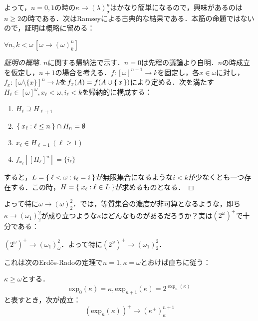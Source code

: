 \documentclass[a4paper]{bxjsarticle}
\newcommand{\Erdos}{Erd\H{o}s}
\begin{document}
よって，$n = 0, 1$の時の$\kappa \longrightarrow (\lambda)^n_\sigma$はかなり簡単になるので，興味があるのは$n \geq 2$の時である．次はRamseyによる古典的な結果である．本筋の命題ではないので，証明は概略に留める：
\begin{theorem}[Ramsey]
 $\forall n, k < \omega\, [\omega \longrightarrow (\omega)^n_k]$
\end{theorem}
\begin{proof}[証明の概略]
 $n$に関する帰納法で示す．$n = 0$は先程の議論より自明．$n$の時成立を仮定し，$n+1$の場合を考える．$f: [\omega]^{n+1} \rightarrow k$を固定し，各$x \in \omega$に対し，$f_x : [\omega \setminus \{x\}]^n \rightarrow k$を$f_x(A) = f(A \cup \set{x})$により定める．次を満たす$H_\ell \in [\omega]^\omega, x_\ell < \omega, i_\ell < k$を帰納的に構成する：
 \begin{enumerate}[label=(\alph*)]
  \item $H_\ell \supseteq H_{\ell+1}$
  \item $\Set{x_\ell : \ell \leq n} \cap H_{n} = \emptyset$
  \item $x_\ell \in H_{\ell - 1}\, (\ell \geq 1)$
  \item $f_{x_\ell}\left[[H_\ell]^n\right] = \{i_\ell\}$
 \end{enumerate}
 すると，$L = \Set{\ell < \omega : i_\ell = i}$が無限集合になるような$i < k$が少なくとも一つ存在する．この時，$H = \Set{x_\ell : \ell \in L}$が求めるものとなる．\mbox{}
\end{proof}

よって特に$\omega \longrightarrow (\omega)^2_2$．では，等質集合の濃度が非可算となるような，即ち$\kappa \longrightarrow (\omega_1)^2_2$が成り立つような$\kappa$はどんなものがあるだろうか？実は$(2^\omega)^+$で十分である：

\begin{theorem}
 $(2^\omega)^+ \longrightarrow (\omega_1)^2_\omega$．よって特に$(2^\omega)^+ \longrightarrow (\omega_1)^2_2$．
\end{theorem}

これは次のErd\H{o}s-Radoの定理で$n=1, \kappa = \omega$とおけば直ちに従う：

\begin{theorem}[一般化\Erdos-Rado]\label{Th:E-R}
 $\kappa \geq \omega$とする．
 \[
  \mathrm{exp}_0(\kappa) = \kappa, \mathrm{exp}_{n+1}(\kappa) = 2^{\exp_n(\kappa)}
 \]
 と表すとき，次が成立：
 \[
  (\mathrm{exp}_{n}(\kappa))^+ \longrightarrow (\kappa^+)^{n+1}_\kappa
 \]
\end{theorem}
\end{document}
